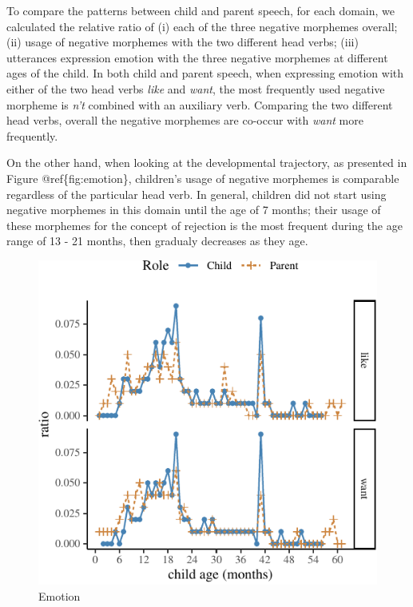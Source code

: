 \documentclass[10pt, letterpaper]{article}
\newenvironment{CodeChunk}{}{}
\begin{document}
To compare the patterns between child and parent speech, for each
domain, we calculated the relative ratio of (i) each of the three
negative morphemes overall; (ii) usage of negative morphemes with the
two different head verbs; (iii) utterances expression emotion with the
three negative morphemes at different ages of the child. In both child
and parent speech, when expressing emotion with either of the two head
verbs \emph{like} and \emph{want}, the most frequently used negative
morpheme is \emph{n't} combined with an auxiliary verb. Comparing the
two different head verbs, overall the negative morphemes are co-occur
with \emph{want} more frequently.

On the other hand, when looking at the developmental trajectory, as
presented in Figure @ref\{fig:emotion\}, children's usage of negative
morphemes is comparable regardless of the particular head verb. In
general, children did not start using negative morphemes in this domain
until the age of 7 months; their usage of these morphemes for the
concept of rejection is the most frequent during the age range of 13 -
21 months, then gradualy decreases as they age.

\begin{CodeChunk}
\begin{figure}[H]

{\centering \includegraphics{figs/emotion-1} 

}

\caption[Emotion]{Emotion}\label{fig:emotion}
\end{figure}
\end{CodeChunk}
\end{document}
